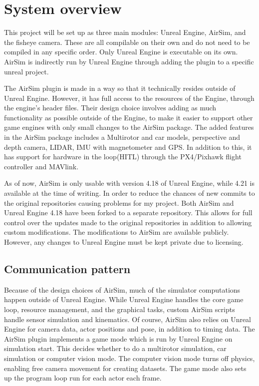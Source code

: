 \section{System overview}

This project will be set up as three main modules: Unreal Engine, AirSim, and the fisheye camera. These are all compilable on their own and do not need to be compiled in any specific order. Only Unreal Engine is executable on its own. AirSim is indirectly run by Unreal Engine through adding the plugin to a specific unreal project.

The AirSim plugin is made in a way so that it technically resides outside of Unreal Engine. However, it has full access to the resources of the Engine, through the engine's header files. Their design choice involves adding as much functionality as possible outside of the Engine, to make it easier to support other game engines with only small changes to the AirSim package. The added features in the AirSim package includes a Multirotor and car models, perspective and depth camera, LIDAR, IMU with magnetometer and GPS. In addition to this, it has support for hardware in the loop(HITL) through the PX4/Pixhawk flight controller and MAVlink. 

As of now, AirSim is only usable with version 4.18 of Unreal Engine, while 4.21 is available at the time of writing. In order to reduce the chances of new commits to the original repositories causing problems for my project. Both AirSim and Unreal Engine 4.18 have been forked to a separate repository. This allows for full control over the updates made to the original repositories in addition to allowing custom modifications. The modifications to AirSim are available publicly. However, any changes to Unreal Engine must be kept private due to licensing.

\subsection{Communication pattern}

Because of the design choices of AirSim, much of the simulator computations happen outside of Unreal Engine. While Unreal Engine handles the core game loop, resource management, and the graphical tasks, custom AirSim scripts handle sensor simulation and kinematics. Of course, AirSim also relies on Unreal Engine for camera data, actor positions and pose, in addition to timing data. The AirSim plugin implements a game mode which is run by Unreal Engine on simulation start. This decides whether to do a multirotor simulation, car simulation or computer vision mode. The computer vision mode turns off physics, enabling free camera movement for creating datasets. The game mode also sets up the program loop run for each actor each frame.

